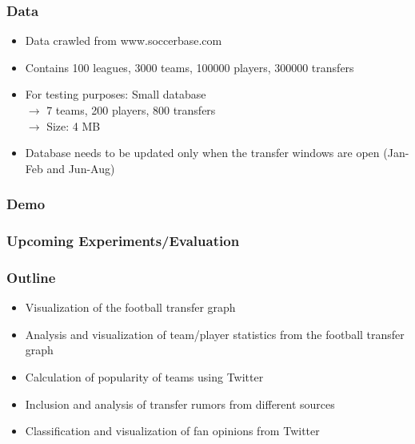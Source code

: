 \documentclass{beamer}
\begin{document}
	\begin{frame}
    \frametitle{Data}
		\begin{itemize}
      \item Data crawled from www.soccerbase.com
			\item Contains 100 leagues, 3000 teams, 100000 players, 300000 transfers
			\item For testing purposes: Small database \\
						$\rightarrow$ 7 teams, 200 players, 800 transfers \\
						$\rightarrow$ Size: 4 MB
			\item Database needs to be updated only when the transfer windows are open (Jan-Feb and Jun-Aug)
		\end{itemize}
  \end{frame}
	
	\begin{frame}
    \frametitle{Demo}
  \end{frame}
	
	
	\begin{frame}
    \frametitle{Upcoming Experiments/Evaluation}
  \end{frame}
	
	\begin{frame}
    \frametitle{Outline}
		\begin{itemize}
      \item Visualization of the football transfer graph \checkmark
			\item Analysis and visualization of team/player statistics from the football transfer graph
			\item Calculation of popularity of teams using Twitter
			\item Inclusion and analysis of transfer rumors from different sources
			\item Classification and visualization of fan opinions from Twitter
		\end{itemize}
  \end{frame}
	
\end{document}
